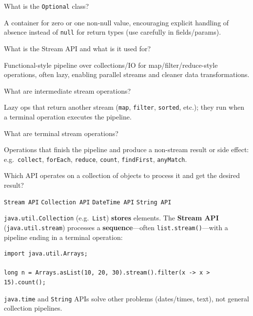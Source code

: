 \question[4]
What is the \texttt{Optional} class?
\begin{solutionorbox}[1.2in]
  A container for zero or one non-null value, encouraging explicit handling of absence instead of \texttt{null} for return types (use carefully in fields/params).
\end{solutionorbox}

\question[4]
What is the Stream API and what is it used for?
\begin{solutionorbox}[1.35in]
  Functional-style pipeline over collections/IO for map/filter/reduce-style operations, often lazy, enabling parallel streams and cleaner data transformations.
\end{solutionorbox}

\question[4]
What are intermediate stream operations?
\begin{solutionorbox}[1.2in]
  Lazy ops that return another stream (\texttt{map}, \texttt{filter}, \texttt{sorted}, etc.); they run when a terminal operation executes the pipeline.
\end{solutionorbox}

\question[4]
What are terminal stream operations?
\begin{solutionorbox}[1.2in]
  Operations that finish the pipeline and produce a non-stream result or side effect: e.g.\ \texttt{collect}, \texttt{forEach}, \texttt{reduce}, \texttt{count}, \texttt{findFirst}, \texttt{anyMatch}.
\end{solutionorbox}

\newpage

\question[4]
Which API operates on a collection of objects to process it and get the desired result?
\begin{choices}
  \CorrectChoice \texttt{Stream API}
  \choice \texttt{Collection API}
  \choice \texttt{DateTime API}
  \choice \texttt{String API}
\end{choices}
\begin{solution}
  \texttt{java.util.Collection} (e.g.\ \texttt{List}) \textbf{stores} elements. The \textbf{Stream API} (\texttt{java.util.stream}) processes a \textbf{sequence}---often \texttt{list.stream()}---with a pipeline ending in a terminal operation:

\begin{lstlisting}[style=java]
import java.util.Arrays;

long n = Arrays.asList(10, 20, 30).stream().filter(x -> x > 15).count();
\end{lstlisting}

  \texttt{java.time} and \texttt{String} APIs solve other problems (dates/times, text), not general collection pipelines.
\end{solution}


